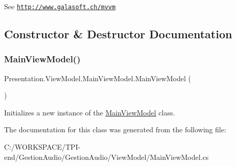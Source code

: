 See \href{http://www.galasoft.ch/mvvm}{\tt http\+://www.\+galasoft.\+ch/mvvm} 

\subsection{Constructor \& Destructor Documentation}
\mbox{\label{class_presentation_1_1_view_model_1_1_main_view_model_a426844e65f93f554671ca046aec78eb3}} 
\subsubsection{\texorpdfstring{Main\+View\+Model()}{MainViewModel()}}
{\footnotesize\ttfamily Presentation.\+View\+Model.\+Main\+View\+Model.\+Main\+View\+Model (\begin{DoxyParamCaption}{ }\end{DoxyParamCaption})}



Initializes a new instance of the \hyperlink{class_presentation_1_1_view_model_1_1_main_view_model}{Main\+View\+Model} class. 



The documentation for this class was generated from the following file\+:\begin{DoxyCompactItemize}
\item 
C\+:/\+W\+O\+R\+K\+S\+P\+A\+C\+E/\+T\+P\+I-\/end/\+Gestion\+Audio/\+Gestion\+Audio/\+View\+Model/Main\+View\+Model.\+cs\end{DoxyCompactItemize}
